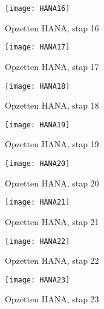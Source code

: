             \begin{figure}	
                \centering
                \texttt{[image: HANA16]}
                \caption{Opzetten HANA, stap 16} \label{HANA16}
            \end{figure}
            
            \begin{figure}	
                \centering
                \texttt{[image: HANA17]}
                \caption{Opzetten HANA, stap 17} \label{HANA17}
            \end{figure}
            
            \begin{figure}	
                \centering
                \texttt{[image: HANA18]}
                \caption{Opzetten HANA, stap 18} \label{HANA18}
            \end{figure}
            
            \begin{figure}	
                \centering
                \texttt{[image: HANA19]}
                \caption{Opzetten HANA, stap 19} \label{HANA19}
            \end{figure}
            
            \begin{figure}	
                \centering
                \texttt{[image: HANA20]}
                \caption{Opzetten HANA, stap 20} \label{HANA20}
            \end{figure}
            
            \begin{figure}	
                \centering
                \texttt{[image: HANA21]}
                \caption{Opzetten HANA, stap 21} \label{HANA21}
            \end{figure}
        
            \begin{figure}	
                \centering
                \texttt{[image: HANA22]}
                \caption{Opzetten HANA, stap 22} \label{HANA22}
            \end{figure}
            
            \begin{figure}	
                \centering
                \texttt{[image: HANA23]}
                \caption{Opzetten HANA, stap 23} \label{HANA23}
            \end{figure}
            
